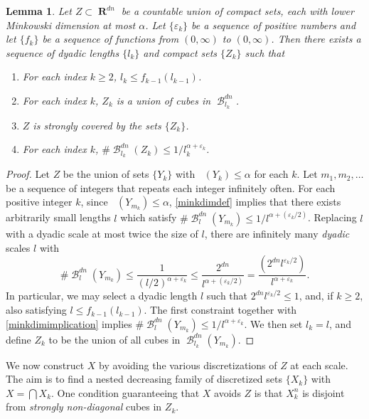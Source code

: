 \documentclass[dvipsnames,letterpaper,12pt]{article}
\numberwithin{equation}{section}
\theoremstyle{plain}
\newtheorem{lemma}{Lemma}
\DeclareMathOperator{\lowminkdim}{\underline{\dim}_{\mathbf{M}}}
\DeclareMathOperator{\RR}{\mathbf{R}}
\DeclareMathOperator{\B}{\mathcal{B}}
\begin{document}
\begin{lemma} \label{coveringlemma}
	Let $Z \subset \RR^{dn}$ be a countable union of compact sets, each with lower Minkowski dimension at most $\alpha$. Let $\{ \varepsilon_k \}$ be a sequence of positive numbers and let $\{ f_k \}$ be a sequence of functions from $(0,\infty)$ to $(0,\infty)$. Then there exists a sequence of dyadic lengths $\{ l_k \}$ and compact sets $\{ Z_k \}$ such that
	\begin{enumerate}
		\item For each index $k \geq 2$, $l_k \leq f_{k-1}(l_{k-1})$.
		\item For each index $k$, $Z_k$ is a union of cubes in $\B^{dn}_{l_k}$.
		\item $Z$ is strongly covered by the sets $\{ Z_k \}$.
		\item For each index $k$, $\# \B^{dn}_{l_k}(Z_k) \leq 1/l_k^{\alpha + \varepsilon_k}$.
	\end{enumerate}
\end{lemma}
\begin{proof}
	Let $Z$ be the union of sets $\{ Y_k \}$ with $\lowminkdim(Y_k) \leq \alpha$ for each $k$. Let $m_1, m_2, \dots$ be a sequence of integers that repeats each integer infinitely often. For each positive integer $k$, since $\lowminkdim(Y_{m_k}) \leq \alpha$, \eqref{minkdimdef} implies that there exists arbitrarily small lengths $l$ which satisfy $\# \B_l^{dn}(Y_{m_k}) \leq 1/l^{\alpha + (\varepsilon_k/2)}$. Replacing $l$ with a dyadic scale at most twice the size of $l$, there are infinitely many {\it dyadic} scales $l$ with
	\begin{equation} \label{minkdimimplication}
		\# \B^{dn}_l(Y_{m_k}) \leq \frac{1}{(l/2)^{\alpha + \varepsilon_k}} \leq \frac{2^{dn}}{l^{\alpha + (\varepsilon_k/2)}} = \frac{\left( 2^{dn} l^{\varepsilon_k/2} \right)}{l^{\alpha + \varepsilon_k}}.
	\end{equation}
	In particular, we may select a dyadic length $l$ such that $2^{dn} l^{\varepsilon_k/2} \leq 1$, and, if $k \geq 2$, also satisfying $l \leq f_{k-1}(l_{k-1})$. The first constraint together with \eqref{minkdimimplication} implies $\# \B^{dn}_l(Y_{m_k}) \leq 1/l^{\alpha + \varepsilon_k}$. We then set $l_k = l$, and define $Z_k$ to be the union of all cubes in $\B_{l_k}^{dn}(Y_{m_k})$.
\end{proof}

We now construct $X$ by avoiding the various discretizations of $Z$ at each scale. The aim is to find a nested decreasing family of discretized sets $\{ X_k \}$ with $X = \bigcap X_k$. One condition guaranteeing that $X$ avoids $Z$ is that $X_k^n$ is disjoint from {\it strongly non-diagonal} cubes in $Z_k$.
\end{document}
